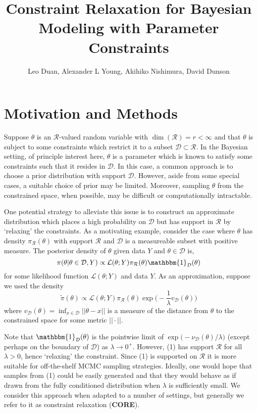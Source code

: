 \documentclass[12 point]{article}
\title{Constraint Relaxation for Bayesian Modeling with
Parameter Constraints}
\author{Leo Duan, Alexander L Young, Akihiko Nishimura, David Dunson}
\newcommand{\core}{\textbf{CORE}}
\begin{document}
\maketitle

\section{Motivation and Methods}

Suppose $\theta$ is an $\mathcal{R}$-valued random variable with $\dim(\mathcal{R})=r<\infty$ and that $\theta$ is subject to some constraints which restrict it to a subset $\mathcal{D} \subset \mathcal{R}$. In the Bayesian setting, of principle interest here, $\theta$ is a parameter which is known to satisfy some constraints such that it resides in $\mathcal{D}$.  In this case, a common approach is to choose a prior distribution with support $\mathcal{D}.$ However, aside from some special cases, a suitable choice of prior may be limited.  Moreover, sampling $\theta$ from the constrained space, when possible, may be difficult or computationally intractable.

One potential strategy to alleviate this issue is to construct an approximate distribution which places a high probability on $\mathcal{D}$ but has support in $\mathcal{R}$ by `relaxing' the constraints.  As a motivating example, consider the case where $\theta$ has density $\pi_\mathcal{R}(\theta)$ with support $\mathcal{R}$ and $\mathcal{D}$ is a measureable subset with positive measure.  The posterior density of $\theta$ given data $Y$ and $\theta \in \mathcal{D}$ is, $$\pi(\theta | \theta \in \mathcal{D}, Y) \propto \mathcal{L}(\theta; Y) \pi_\mathcal{R}(\theta) \mathbbm{1}_\mathcal{D} (\theta)$$ for some likelihood function $\mathcal{L}(\theta;Y)$ and data $Y$. 
As an approximation, suppose we used the density 
\begin{equation}
\label{EQ:Rel_Dens_Motivation}
\tilde{\pi}(\theta) \propto \mathcal{L}(\theta; Y)  \pi_\mathcal{R}(\theta) \exp\bigg(-\frac{1}{\lambda} v_\mathcal{D}(\theta)\bigg)
\end{equation} where $v_\mathcal{D}(\theta) = \inf_{x\in\mathcal{D}} ||\theta-x||$ is a measure of the distance from $\theta$ to the constrained space for some metric $||\cdot||$. 

Note that $\mathbbm{1}_\mathcal{D}(\theta)$ is the pointwise limit of $\exp\big(- \nu_\mathcal{D}(\theta)/\lambda)$ (except perhaps on the boundary of $\mathcal{D}$) as $\lambda \to 0^+.$ However, (1) has support $\mathcal{R}$ for all $\lambda > 0$, hence `relaxing' the constraint.   Since (1) is supported on $\mathcal{R}$ it is more suitable for off-the-shelf MCMC sampling strategies.   Ideally, one would hope that samples from (1) could be easily generated and that they would behave as if drawn from the fully conditioned distribution when $\lambda$ is sufficiently small. We consider this approach when adapted to a number of settings, but generally we refer to it as constraint relaxation (\core).
\end{document}
